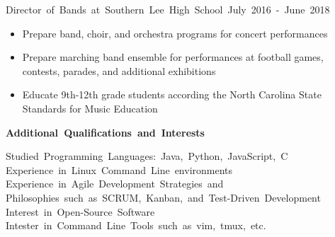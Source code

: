 \documentclass[12pt]{letter}
\begin{document}
    \vspace{2 mm}
    \hbox{Director of Bands at Southern Lee High School \hspace{70pt}
        July 2016 - June 2018}
    \vspace{-5 mm}
    \begin{itemize}
        \itemsep 0em
        \item Prepare band, choir, and orchestra programs for concert 
            performances
        \item Prepare marching band ensemble for performances at football
            games, contests, parades, and additional exhibitions
        \item Educate 9th-12th grade students according the North Carolina
            State Standards for Music Education
    \end{itemize}

    \vspace {10 mm}
    \hbox{\textbf{\large {Additional Qualifications and Interests}}}
    \vspace{3 mm}

    \hbox{Studied Programming Languages: Java, Python, JavaScript, C}
    \hbox{Experience in Linux Command Line environments}
    \hbox{Experience in Agile Development Strategies and} 
    \hbox{Philosophies such as SCRUM, Kanban, and Test-Driven Development}
    \hbox{Interest in Open-Source Software}
    \hbox{Intester in Command Line Tools such as vim, tmux, etc.}
\end{document}
